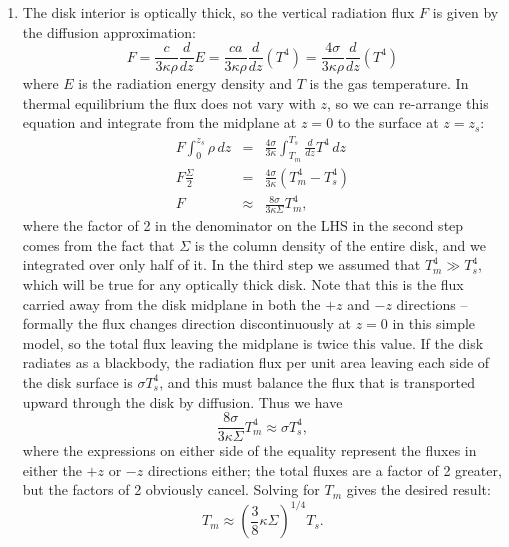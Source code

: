 \begin{enumerate}
\begin{enumerate}
\item The disk interior is optically thick, so the vertical radiation flux $F$ is given by the diffusion approximation:
\begin{displaymath}
F = \frac{c}{3\kappa\rho} \frac{d}{dz} E = \frac{ca}{3\kappa\rho} \frac{d}{dz} (T^4) = \frac{4 \sigma}{3\kappa\rho}  \frac{d}{dz} (T^4)
\end{displaymath}
where $E$ is the radiation energy density and $T$ is the gas temperature. In thermal equilibrium the flux does not vary with $z$, so we can re-arrange this equation and integrate from the midplane at $z=0$ to the surface at $z=z_s$:
\begin{eqnarray*}
F \int_0^{z_s} \rho \, dz & = & \frac{4\sigma}{3\kappa} \int_{T_m}^{T_s} \frac{d}{dz} T^4 \, dz \\
F \frac{\Sigma}{2} & = & \frac{4\sigma}{3\kappa} \left(T_m^4 - T_s^4\right) \\
F & \approx & \frac{8\sigma}{3\kappa\Sigma} T_m^4,
\end{eqnarray*}
where the factor of 2 in the denominator on the LHS in the second step comes from the fact that $\Sigma$ is the column density of the entire disk, and we integrated over only half of it. In the third step we assumed that $T_m^4 \gg T_s^4$, which will be true for any optically thick disk. Note that this is the flux carried away from the disk midplane in both the $+z$ and $-z$ directions -- formally the flux changes direction discontinuously at $z=0$ in this simple model, so the total flux leaving the midplane is twice this value. If the disk radiates as a blackbody, the radiation flux per unit area leaving each side of the disk surface is $\sigma T_s^4$, and this must balance the flux that is transported upward through the disk by diffusion. Thus we have
\begin{displaymath}
\frac{8\sigma}{3\kappa\Sigma} T_m^4 \approx \sigma T_s^4,
\end{displaymath}
where the expressions on either side of the equality represent the fluxes in either the $+z$ or $-z$ directions either; the total fluxes are a factor of 2 greater, but the factors of 2 obviously cancel. Solving for $T_m$ gives the desired result:
\begin{displaymath}
T_m \approx \left(\frac{3}{8}\kappa\Sigma\right)^{1/4} T_s.
\end{displaymath}


\end{enumerate}
\end{enumerate}
